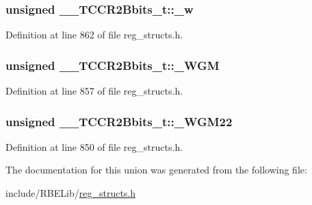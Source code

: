 \hypertarget{union_____t_c_c_r2_bbits__t_a3644b0ebb2a536b718e9eda6ff22527e}{
\subsubsection[{\+\_\+w}]{\setlength{\rightskip}{0pt plus 5cm}unsigned \+\_\+\+\_\+\+T\+C\+C\+R2\+Bbits\+\_\+t\+::\+\_\+w}}\label{union_____t_c_c_r2_bbits__t_a3644b0ebb2a536b718e9eda6ff22527e}


Definition at line 862 of file reg\+\_\+structs.\+h.

\hypertarget{union_____t_c_c_r2_bbits__t_ab6fd78f1ec97904d5a295779685c6bd9}{
\subsubsection[{\+\_\+\+W\+G\+M}]{\setlength{\rightskip}{0pt plus 5cm}unsigned \+\_\+\+\_\+\+T\+C\+C\+R2\+Bbits\+\_\+t\+::\+\_\+\+W\+G\+M}}\label{union_____t_c_c_r2_bbits__t_ab6fd78f1ec97904d5a295779685c6bd9}


Definition at line 857 of file reg\+\_\+structs.\+h.

\hypertarget{union_____t_c_c_r2_bbits__t_a45580ae5e09200c47b31181f1b7e0b6d}{
\subsubsection[{\+\_\+\+W\+G\+M22}]{\setlength{\rightskip}{0pt plus 5cm}unsigned \+\_\+\+\_\+\+T\+C\+C\+R2\+Bbits\+\_\+t\+::\+\_\+\+W\+G\+M22}}\label{union_____t_c_c_r2_bbits__t_a45580ae5e09200c47b31181f1b7e0b6d}


Definition at line 850 of file reg\+\_\+structs.\+h.



The documentation for this union was generated from the following file\+:\begin{DoxyCompactItemize}
\item 
include/\+R\+B\+E\+Lib/\hyperlink{reg__structs_8h}{reg\+\_\+structs.\+h}\end{DoxyCompactItemize}
